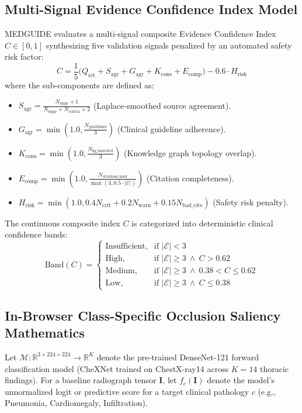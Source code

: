 \documentclass[journal,10pt,twocolumn]{IEEEtran}
\begin{document}
\subsection{Multi-Signal Evidence Confidence Index Model}
MEDGUIDE evaluates a multi-signal composite Evidence Confidence Index $C \in [0, 1]$ synthesizing five validation signals penalized by an automated safety risk factor:
\begin{equation}
C = \frac{1}{5}\Big( Q_{\text{ret}} + S_{\text{agr}} + G_{\text{agr}} + K_{\text{cons}} + E_{\text{comp}} \Big) - 0.6 \cdot H_{\text{risk}}
\end{equation}
where the sub-components are defined as:
\begin{itemize}
    \item $S_{\text{agr}} = \frac{N_{\text{supp}} + 1}{N_{\text{supp}} + N_{\text{contra}} + 2}$ (Laplace-smoothed source agreement).
    \item $G_{\text{agr}} = \min\left(1.0, \frac{N_{\text{guidelines}}}{3}\right)$ (Clinical guideline adherence).
    \item $K_{\text{cons}} = \min\left(1.0, \frac{N_{\text{kg\_matched}}}{3}\right)$ (Knowledge graph topology overlap).
    \item $E_{\text{comp}} = \min\left(1.0, \frac{N_{\text{citations\_used}}}{\max(3, 0.5 \cdot |\mathcal{E}|)}\right)$ (Citation completeness).
    \item $H_{\text{risk}} = \min(1.0, 0.4 N_{\text{crit}} + 0.2 N_{\text{warn}} + 0.15 N_{\text{bad\_cite}})$ (Safety risk penalty).
\end{itemize}

The continuous composite index $C$ is categorized into deterministic clinical confidence bands:
\begin{equation}
\text{Band}(C) = \begin{cases}
\text{Insufficient}, & \text{if } |\mathcal{E}| < 3 \\
\text{High},         & \text{if } |\mathcal{E}| \ge 3 \ \land \ C > 0.62 \\
\text{Medium},       & \text{if } |\mathcal{E}| \ge 3 \ \land \ 0.38 < C \le 0.62 \\
\text{Low},          & \text{if } |\mathcal{E}| \ge 3 \ \land \ C \le 0.38
\end{cases}
\end{equation}

\subsection{In-Browser Class-Specific Occlusion Saliency Mathematics}
Let $\mathcal{M}: \mathbb{R}^{3 \times 224 \times 224} \to \mathbb{R}^K$ denote the pre-trained DenseNet-121 forward classification model (CheXNet \cite{rajpurkar2017chexnet} trained on ChestX-ray14 \cite{wang2017chestx} across $K=14$ thoracic findings). For a baseline radiograph tensor $\mathbf{I}$, let $f_c(\mathbf{I})$ denote the model's unnormalized logit or predictive score for a target clinical pathology $c$ (e.g., Pneumonia, Cardiomegaly, Infiltration).
\end{document}
